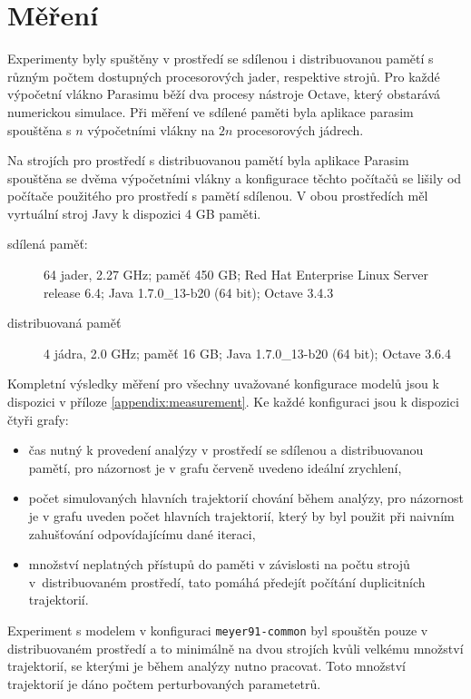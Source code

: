 \section{Měření}\label{section:measurement}

Experimenty byly spuštěny v prostředí se sdílenou i distribuovanou pamětí s různým
počtem dostupných procesorových jader, respektive strojů. Pro každé výpočetní vlákno
Parasimu běží dva procesy nástroje Octave, který obstarává numerickou simulace. Při měření
ve sdílené paměti byla aplikace parasim spouštěna s $n$ výpočetními vlákny na $2n$
procesorových jádrech.

Na strojích pro prostředí s distribuovanou pamětí byla aplikace Parasim spouštěna se dvěma
výpočetními vlákny a konfigurace těchto počítačů se lišily od počítače použitého pro prostředí
s pamětí sdílenou. V obou prostředích měl vyrtuální stroj Javy k dispozici 4 GB paměti.

\begin{description}
	\item[sdílená paměť: ]
		 64 jader, 2.27 GHz; paměť 450 GB; Red Hat Enterprise Linux Server release 6.4; Java 1.7.0\_13-b20 (64 bit); Octave 3.4.3
	\item[distribuovaná paměť]
		4 jádra, 2.0 GHz; paměť 16 GB; Java 1.7.0\_13-b20 (64 bit); Octave 3.6.4
\end{description}

Kompletní výsledky měření pro všechny uvažované konfigurace modelů jsou k dispozici
v příloze \ref{appendix:measurement}. Ke každé konfiguraci jsou k dispozici čtyři grafy:

\begin{itemize}
	\item	čas nutný k provedení analýzy v prostředí se sdílenou a distribuovanou pamětí,
			pro názornost je v grafu červeně uvedeno ideální zrychlení,
	\item	počet simulovaných hlavních trajektorií chování během analýzy, pro názornost je v grafu
			uveden počet hlavních trajektorií, který by byl použit při naivním zahušťování odpovídajícímu
			dané iteraci,
	\item	množství neplatných přístupů do paměti v závislosti na počtu strojů v~dis\-tri\-buova\-ném prostředí,
			tato pomáhá předejít po\-čí\-tá\-ní duplicitních trajektorií.
\end{itemize}

Experiment s modelem v konfiguraci \texttt{meyer91-common} byl spouštěn pouze v distribuovaném prostředí
a to minimálně na dvou strojích kvůli velkému množství trajektorií, se kterými je během analýzy nutno
pracovat. Toto množství trajektorií je dáno počtem perturbovaných parametetrů.

